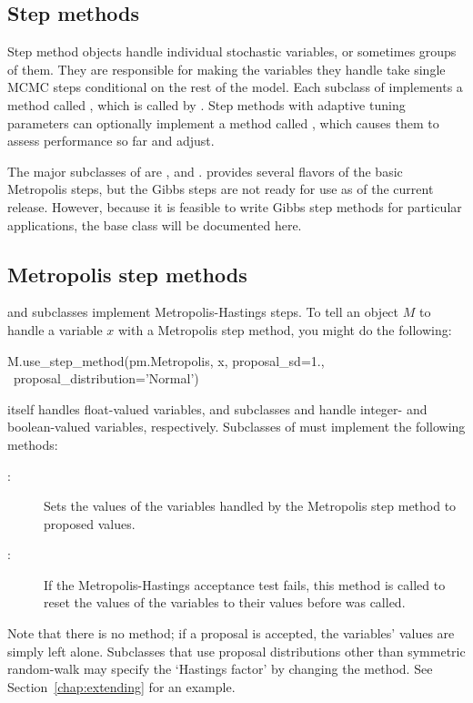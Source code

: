 \documentclass[]{jss}
\begin{document}
\subsection{Step methods} \label{sec:stepmethod}


Step method objects handle individual stochastic variables, or sometimes groups of them. They are responsible for making the variables they handle take single MCMC steps conditional on the rest of the model. Each subclass of  implements a method called , which is called by . Step methods with adaptive tuning parameters can optionally implement a method called , which causes them to assess performance so far and adjust.

The major subclasses of  are ,
 and .  provides several flavors of the
basic Metropolis steps, but the Gibbs steps are not ready for use as of the
current release. However, because it is feasible to write Gibbs step methods
for particular applications, the  base class will be documented
here.

\subsection{Metropolis step methods} \label{metropolis}

 and subclasses implement Metropolis-Hastings steps. To tell an  object $M$ to handle a variable $x$ with a Metropolis step method, you might do the following:
\begin{CodeInput}
M.use_step_method(pm.Metropolis, x, proposal_sd=1., \ 
    proposal_distribution='Normal')
\end{CodeInput}

 itself handles float-valued variables, and subclasses  and  handle integer- and boolean-valued variables, respectively. Subclasses of  must implement the following methods:
\begin{description}
    \item[:] Sets the values of the variables handled by the Metropolis step method to proposed values.
    \item[\code{reject()}:] If the Metropolis-Hastings acceptance test fails, this method is called to reset the values of the variables to their values before  was called.
\end{description}
Note that there is no  method; if a proposal is accepted, the variables' values are simply left alone. Subclasses that use proposal distributions other than symmetric random-walk may specify the `Hastings factor' by changing the  method. See Section~\ref{chap:extending} for an example.
\end{document}
